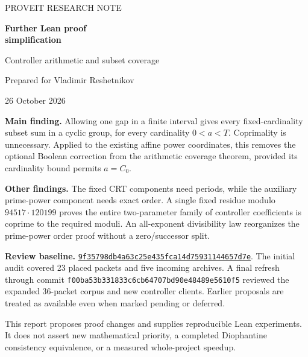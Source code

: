 \documentclass[11pt,letterpaper]{article}
\begin{document}
\hypersetup{pageanchor=false}
\begin{titlepage}
\vspace*{0.65in}
{\Large\sffamily\color{teal} PROVEIT RESEARCH NOTE\par}
\vspace{0.25in}
{\Huge\bfseries\color{navy} Further Lean proof\\[6pt] simplification\par}
\vspace{0.2in}
{\Large Controller arithmetic and subset coverage\par}
\vspace{0.35in}
{\large Prepared for Vladimir Reshetnikov\par}
{\large 26 October 2026\par}
\vspace{0.35in}
\begin{minipage}{0.94\textwidth}
\textbf{Main finding.} Allowing one gap in a finite interval gives every
fixed-cardinality subset sum in a cyclic group, for every cardinality
$0<a<T$. Coprimality is unnecessary. Applied to the existing affine power
coordinates, this removes the optional Boolean correction from the arithmetic
coverage theorem, provided its cardinality bound permits $a=C_0$.

\textbf{Other findings.} The fixed CRT components need periods, while the
auxiliary prime-power component needs exact order. A single fixed residue
modulo $94517\cdot120199$ proves the entire two-parameter family of controller
coefficients is coprime to the required moduli. An all-exponent divisibility
law reorganizes the prime-power order proof without a zero/successor split.

\textbf{Review baseline.}
\href{https://github.com/VladimirReshetnikov/ProveIt/commit/9f35798db4a63c25e435fca14d75931144657d7e}{\texttt{9f35798db4a63c25e435fca14d75931144657d7e}}.
The initial audit covered 23 placed packets and five incoming archives.
A final refresh through commit \texttt{f00ba53b331833c6cb64707bd90e48489e5610f5}
reviewed the expanded 36-packet corpus and new controller clients. Earlier
proposals are treated as available even when marked pending or deferred.
\end{minipage}
\vfill
{\small This report proposes proof changes and supplies reproducible Lean
experiments. It does not assert new mathematical priority, a completed
Diophantine consistency equivalence, or a measured whole-project speedup.}
\end{titlepage}
\hypersetup{pageanchor=true}
\begingroup
\small
\setlength{\parskip}{0pt}
\tableofcontents
\endgroup
\newpage
{}
\end{document}
